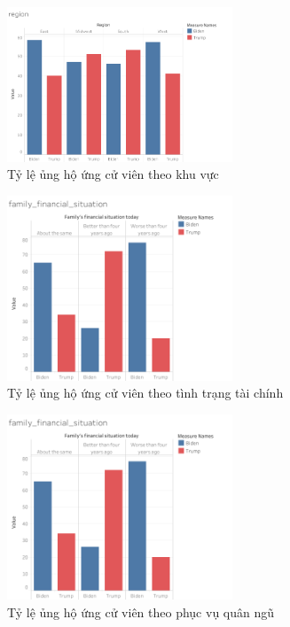 \documentclass[14pt, a4paper]{article}
\numberwithin{equation}{section}
\numberwithin{figure}{section}
\numberwithin{dl}{section}
\numberwithin{md}{section}
\numberwithin{bd}{section}
\numberwithin{dn}{section}
\numberwithin{hq}{section}
\begin{document}
    \begin{figure}[h!]
        \centering
        \includegraphics[width=0.6\textwidth]{figures/region.png}
        \caption{Tỷ lệ ủng hộ ứng cử viên theo khu vực}
    \end{figure}

    \begin{figure}[h!]
        \centering
        \includegraphics[width=0.6\textwidth]{figures/family_financial_situation.png}
        \caption{Tỷ lệ ủng hộ ứng cử viên theo tình trạng tài chính}
    \end{figure}

    \begin{figure}[h!]
        \centering
        \includegraphics[width=0.6\textwidth]{figures/family_financial_situation.png}
        \caption{Tỷ lệ ủng hộ ứng cử viên theo phục vụ quân ngũ}
    \end{figure}
\end{document}
